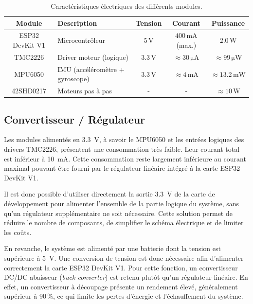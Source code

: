 \begin{table}[H]
\centering
\begin{tabular}{|c|p{4.2cm}|c|c|c|}
\hline
\textbf{Module} & \textbf{Description} & \textbf{Tension} & \textbf{Courant} & \textbf{Puissance} \\
\hline
ESP32 DevKit V1 & Microcontrôleur & $5\,\si{\volt}$ & $400\,\si{\milli\ampere}$ (max.) & $2.0\,\si{\watt}$ \\
\hline
TMC2226 & Driver moteur (logique) & $3.3\,\si{\volt}$ & $\approx 30\,\si{\micro\ampere}$ & $\approx 99\,\si{\micro\watt}$ \\
\hline
MPU6050 & IMU (accéléromètre + gyroscope) & $3.3\,\si{\volt}$ & $\approx 4\,\si{\milli\ampere}$ & $\approx 13.2\,\si{\milli\watt}$ \\
\hline
42SHD0217 & Moteurs pas à pas & - & - & $\approx 10\,\si{\watt}$ \\
\hline
\end{tabular}
\caption{Caractéristiques électriques des différents modules.}
\label{tab:tensions_alimentations}
\end{table}
\subsection{Convertisseur / Régulateur}

Les modules alimentés en \SI{3.3}{\volt}, à savoir le MPU6050 et les entrées logiques des drivers TMC2226, présentent une consommation très faible. Leur courant total est inférieur à \SI{10}{\milli\ampere}. Cette consommation reste largement inférieure au courant maximal pouvant être fourni par le régulateur linéaire intégré à la carte ESP32 DevKit V1.

Il est donc possible d'utiliser directement la sortie \SI{3.3}{\volt} de la carte de développement pour alimenter l'ensemble de la partie logique du système, sans qu'un régulateur supplémentaire ne soit nécessaire. Cette solution permet de réduire le nombre de composants, de simplifier le schéma électrique et de limiter les coûts.

En revanche, le système est alimenté par une batterie dont la tension est supérieure à \SI{5}{\volt}. Une conversion de tension est donc nécessaire afin d'alimenter correctement la carte ESP32 DevKit V1. Pour cette fonction, un convertisseur DC/DC abaisseur (\emph{buck converter}) est retenu plutôt qu'un régulateur linéaire. En effet, un convertisseur à découpage présente un rendement élevé, généralement supérieur à 90\,\%, ce qui limite les pertes d'énergie et l'échauffement du système.

